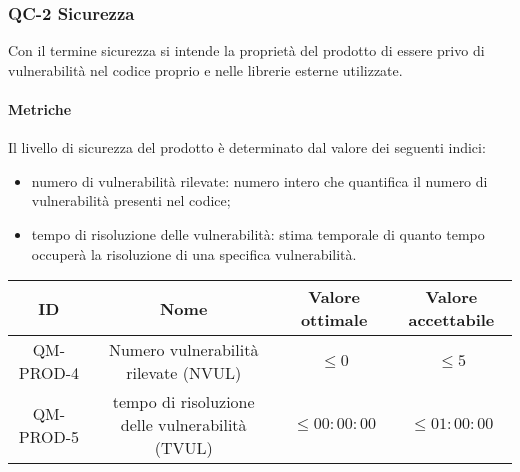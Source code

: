 \subsubsection{QC-2 Sicurezza}
Con il termine sicurezza si intende la proprietà del prodotto di essere privo di vulnerabilità nel codice proprio e nelle librerie esterne utilizzate.

	\paragraph{Metriche}
	Il livello di sicurezza del prodotto è determinato dal valore dei seguenti indici:
	\begin{itemize}
		\item numero di vulnerabilità rilevate: numero intero che quantifica il numero di vulnerabilità presenti nel codice;
		\item tempo di risoluzione delle vulnerabilità: stima temporale di quanto tempo occuperà la risoluzione di una specifica vulnerabilità.
	\end{itemize}
	\begin{center}
		\begin{tabular}{|c|c|c|c|}
			\rowcolor{lighter-grayer}
			\hline
			ID & Nome & Valore ottimale & Valore accettabile \\
			\hline
			QM-PROD-4 & Numero vulnerabilità rilevate (NVUL) & \(\le 0\) & \(\le 5\) \\
			\hline
			QM-PROD-5 & tempo di risoluzione delle vulnerabilità (TVUL) & \(\le 00:00:00\) &  \(\le 01:00:00\) \\
			\hline
		\end{tabular}
	\end{center}
